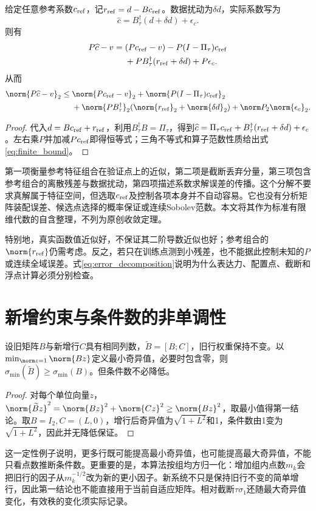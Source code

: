 \begin{proposition}[固定离散系统的误差恒等式]\label{prop:finite_error}
给定任意参考系数$c_{\rm ref}$，记$r_{\rm ref}=d-Bc_{\rm ref}$。数据扰动为$\delta d$，实际系数写为
\[\widehat c=B_\tau^\dagger(d+\delta d)+\epsilon_c.\]
则有
\begin{align}
P\widehat c-v={}&(Pc_{\rm ref}-v)-P(I-\Pi_\tau)c_{\rm ref}\nonumber\\
&+PB_\tau^\dagger(r_{\rm ref}+\delta d)+P\epsilon_c.\label{eq:error_decomposition}
\end{align}
从而
\begin{align}
\norm{P\widehat c-v}_2\le{}&\norm{Pc_{\rm ref}-v}_2+\norm{P(I-\Pi_\tau)c_{\rm ref}}_2\nonumber\\
&+\norm{PB_\tau^\dagger}_2(\norm{r_{\rm ref}}_2+\norm{\delta d}_2)
+\norm P_2\norm{\epsilon_c}_2.\label{eq:finite_bound}
\end{align}
\end{proposition}
\begin{proof}
代入$d=Bc_{\rm ref}+r_{\rm ref}$，利用$B_\tau^\dagger B=\Pi_\tau$，得到$\widehat c=\Pi_\tau c_{\rm ref}+B_\tau^\dagger(r_{\rm ref}+\delta d)+\epsilon_c$。左右乘$P$并加减$Pc_{\rm ref}$即得恒等式；三角不等式和算子范数性质给出式\eqref{eq:finite_bound}。
\end{proof}

第一项衡量参考特征组合在验证点上的近似，第二项是截断丢弃分量，第三项包含参考组合的离散残差与数据扰动，第四项描述系数求解误差的传播。这个分解不要求真解属于特征空间，但选取$c_{\rm ref}$及控制各项本身并不自动容易。它也没有分析矩阵装配误差、候选点选择的概率保证或连续Sobolev范数。本文将其作为标准有限维代数的自含整理，不列为原创收敛定理。

特别地，真实函数值近似好，不保证其二阶导数近似也好；参考组合的$\norm{r_{\rm ref}}$仍需考虑。反之，若只在训练点测到小残差，也不能据此控制未知的$P$或连续全域误差。式\eqref{eq:error_decomposition}说明为什么表达力、配置点、截断和浮点计算必须分别检查。

\section{新增约束与条件数的非单调性}
\begin{proposition}[固定列空间的增行性质]\label{prop:rows}
设旧矩阵$B$与新增行$C$具有相同列数，$\widetilde B=[B;C]$，旧行权重保持不变。以$\min_{\norm z=1}\norm{Bz}$定义最小奇异值，必要时包含零，则$\sigma_{\min}(\widetilde B)\ge\sigma_{\min}(B)$。但条件数不必降低。
\end{proposition}
\begin{proof}
对每个单位向量$z$，$\norm{\widetilde Bz}^2=\norm{Bz}^2+\norm{Cz}^2\ge\norm{Bz}^2$，取最小值得第一结论。取$B=I_2,C=(L,0)$，增行后奇异值为$\sqrt{1+L^2}$和1，条件数由1变为$\sqrt{1+L^2}$，因此并无降低保证。
\end{proof}

这一定性例子说明，更多行既可能提高最小奇异值，也可能提高最大奇异值，不能只看点数推断条件数。更重要的是，本算法按组均方归一化：增加组内点数$m_k$会把旧行的因子从$m_k^{-1/2}$改为新的更小因子。新系统不只是保持旧行不变的简单增行，因此第一结论也不能直接用于当前自适应矩阵。相对截断$\tau\sigma_1$还随最大奇异值变化，有效秩的变化须实际记录。
